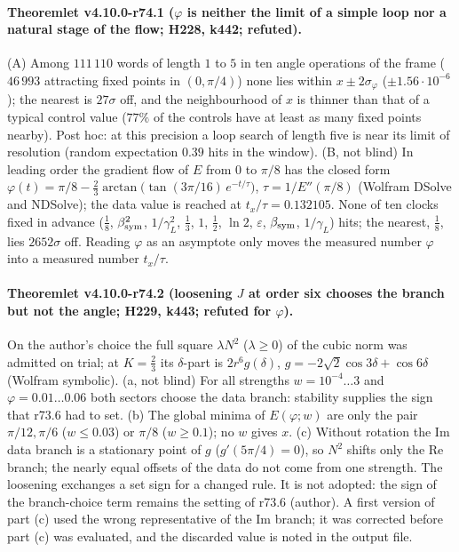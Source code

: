 \paragraph{Theoremlet v4.10.0-r74.1 (\(\varphi\) is neither the limit of a simple loop nor a natural stage of the flow; H228, k442; refuted).}
(A) Among \(111\,110\) words of length \(1\) to \(5\) in ten angle operations of the frame (\(46\,993\) attracting fixed points in \((0,\pi/4)\))
none lies within \(x\pm2\sigma_\varphi\) (\(\pm1.56\cdot10^{-6}\)); the nearest is \(27\sigma\) off, and the neighbourhood of \(x\) is thinner than that of
a typical control value (\(77\%\) of the controls have at least as many fixed points nearby).  Post hoc: at this precision a loop search of length
five is near its limit of resolution (random expectation \(0.39\) hits in the window).  (B, not blind) In leading order the gradient flow of
\(E\) from \(0\) to \(\pi/8\) has the closed form \(\varphi(t)=\pi/8-\tfrac23\arctan\bigl(\tan(3\pi/16)\,e^{-t/\tau}\bigr)\), \(\tau=1/E''(\pi/8)\)
(Wolfram DSolve and NDSolve); the data value is reached at \(t_x/\tau=0.132105\).  None of ten clocks fixed in advance (\(\tfrac18\),
\(\beta_{\rm sym}^2\), \(1/\gamma_L^2\), \(\tfrac13\), \(1\), \(\tfrac12\), \(\ln2\), \(\varepsilon\), \(\beta_{\rm sym}\), \(1/\gamma_L\)) hits; the nearest,
\(\tfrac18\), lies \(2652\sigma\) off.  Reading \(\varphi\) as an asymptote only moves the measured number \(\varphi\) into a measured number
\(t_x/\tau\).

\paragraph{Theoremlet v4.10.0-r74.2 (loosening \(J\) at order six chooses the branch but not the angle; H229, k443; refuted for \(\varphi\)).}
On the author's choice the full square \(\lambda N^2\) (\(\lambda\ge0\)) of the cubic norm was admitted on trial; at \(K=\tfrac23\) its
\(\delta\)-part is \(2r^6g(\delta)\), \(g=-2\sqrt2\cos3\delta+\cos6\delta\) (Wolfram symbolic).  (a, not blind) For all strengths
\(w=10^{-4}\ldots3\) and \(\varphi=0.01\ldots0.06\) both sectors choose the data branch: stability supplies the sign that r73.6 had to set.
(b) The global minima of \(E(\varphi;w)\) are only the pair \(\pi/12,\pi/6\) (\(w\le0.03\)) or \(\pi/8\) (\(w\ge0.1\)); no \(w\) gives \(x\).
(c) Without rotation the Im data branch is a stationary point of \(g\) (\(g'(5\pi/4)=0\)), so \(N^2\) shifts only the Re branch; the nearly equal
offsets of the data do not come from one strength.  The loosening exchanges a set sign for a changed rule.  It is not adopted: the sign of
the branch-choice term remains the setting of r73.6 (author).  A first version of part (c) used the wrong representative of the Im branch; it
was corrected before part (c) was evaluated, and the discarded value is noted in the output file.

